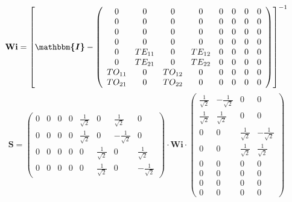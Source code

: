 \[ \mathbf{Wi} =  \left[ \boldsymbol{\mathbbm{I}}  -
\left(\begin{array}{cccccccc} 0 & 0 & 0 & 0 & 0 & 0 & 0 & 0 \\ 0 & 0 &
0 & 0 & 0 & 0 & 0 & 0 \\ 0 & 0 & 0 & 0 & 0 & 0 & 0 & 0 \\ 0 & 0 & 0 &
0 & 0 & 0 & 0 & 0 \\ 0 & TE_{11} & 0 & TE_{12} & 0 & 0 & 0 & 0 \\ 0 &
TE_{21} & 0 & TE_{22} & 0 & 0 & 0 & 0 \\ TO_{11} & 0 & TO_{12} & 0 & 0
& 0 & 0 & 0 \\ TO_{21} & 0 & TO_{22} & 0 & 0 & 0 & 0 & 0
\end{array}\right) \right]^{-1}  \]
\[ \mathbf{S} = \left(\begin{array}{cccccccc} 0 & 0 & 0 & 0 &
\frac{1}{\sqrt{2}} & 0 & \frac{1}{\sqrt{2}} & 0 \\ 0 & 0 & 0 & 0 &
\frac{1}{\sqrt{2}} & 0 & -\frac{1}{\sqrt{2}} & 0 \\ 0 & 0 & 0 & 0 & 0
& \frac{1}{\sqrt{2}} & 0 & \frac{1}{\sqrt{2}} \\ 0 & 0 & 0 & 0 & 0 &
\frac{1}{\sqrt{2}} & 0 & -\frac{1}{\sqrt{2}} \end{array}\right) \cdot
\mathbf{Wi} \cdot\left(\begin{array}{cccc} \frac{1}{\sqrt{2}} &
-\frac{1}{\sqrt{2}} & 0 & 0 \\ \frac{1}{\sqrt{2}} & \frac{1}{\sqrt{2}}
& 0 & 0 \\ 0 & 0 & \frac{1}{\sqrt{2}} & -\frac{1}{\sqrt{2}} \\ 0 & 0 &
\frac{1}{\sqrt{2}} & \frac{1}{\sqrt{2}} \\ 0 & 0 & 0 & 0 \\ 0 & 0 & 0
& 0 \\ 0 & 0 & 0 & 0 \\ 0 & 0 & 0 & 0 \end{array}\right) \]
